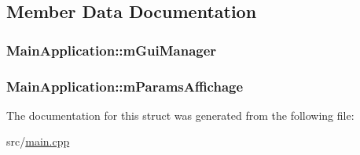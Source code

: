 \subsection{Member Data Documentation}
\subsubsection[{\texorpdfstring{m\+Gui\+Manager}{mGuiManager}}]{ Main\+Application\+::m\+Gui\+Manager}\hypertarget{struct_main_application_a02a37af569312e07b3bd8f8995ef50ec}{}\label{struct_main_application_a02a37af569312e07b3bd8f8995ef50ec}
\subsubsection[{\texorpdfstring{m\+Params\+Affichage}{mParamsAffichage}}]{ Main\+Application\+::m\+Params\+Affichage}\hypertarget{struct_main_application_a6d4bd1a7fbe48146153e7cb5082d6c15}{}\label{struct_main_application_a6d4bd1a7fbe48146153e7cb5082d6c15}


The documentation for this struct was generated from the following file\+:\begin{DoxyCompactItemize}
\item 
src/\hyperlink{main_8cpp}{main.\+cpp}\end{DoxyCompactItemize}
